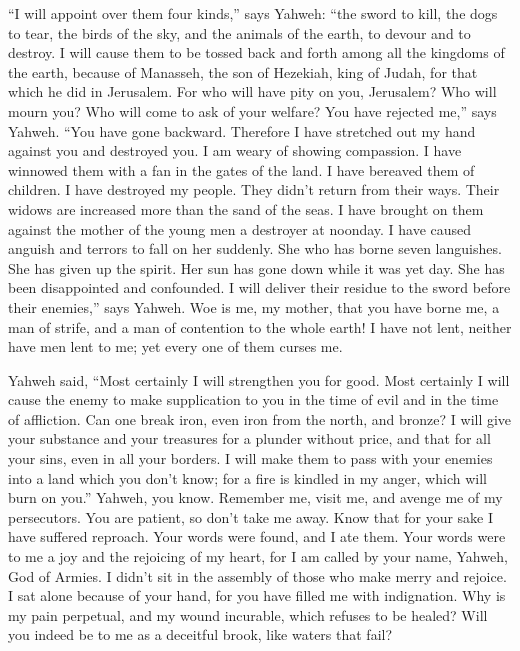  ``I will appoint over them four kinds,'' says Yahweh: ``the
sword to kill, the dogs to tear, the birds of the sky, and the animals
of the earth, to devour and to destroy.  I will cause them
to be tossed back and forth among all the kingdoms of the earth, because
of Manasseh, the son of Hezekiah, king of Judah, for that which he did
in Jerusalem.  For who will have pity on you, Jerusalem? Who
will mourn you? Who will come to ask of your welfare?  You
have rejected me,'' says Yahweh. ``You have gone backward. Therefore I
have stretched out my hand against you and destroyed you. I am weary of
showing compassion.  I have winnowed them with a fan in the
gates of the land. I have bereaved them of children. I have destroyed my
people. They didn't return from their ways.  Their widows
are increased more than the sand of the seas. I have brought on them
against the mother of the young men a destroyer at noonday. I have
caused anguish and terrors to fall on her suddenly.  She who
has borne seven languishes. She has given up the spirit. Her sun has
gone down while it was yet day. She has been disappointed and
confounded. I will deliver their residue to the sword before their
enemies,'' says Yahweh.  Woe is me, my mother, that you
have borne me, a man of strife, and a man of contention to the whole
earth! I have not lent, neither have men lent to me; yet every one of
them curses me.

 Yahweh said, ``Most certainly I will strengthen you for
good. Most certainly I will cause the enemy to make supplication to you
in the time of evil and in the time of affliction.  Can one
break iron, even iron from the north, and bronze?  I will
give your substance and your treasures for a plunder without price, and
that for all your sins, even in all your borders.  I will
make them to pass with your enemies into a land which you don't know;
for a fire is kindled in my anger, which will burn on you.''
 Yahweh, you know. Remember me, visit me, and avenge me of
my persecutors. You are patient, so don't take me away. Know that for
your sake I have suffered reproach.  Your words were found,
and I ate them. Your words were to me a joy and the rejoicing of my
heart, for I am called by your name, Yahweh, God of Armies.
 I didn't sit in the assembly of those who make merry and
rejoice. I sat alone because of your hand, for you have filled me with
indignation.  Why is my pain perpetual, and my wound
incurable, which refuses to be healed? Will you indeed be to me as a
deceitful brook, like waters that fail?

